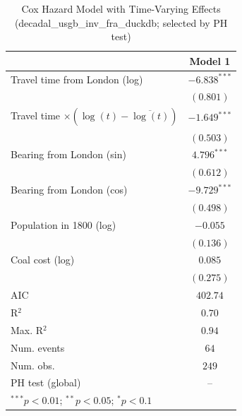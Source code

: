 
\begin{table}
\begin{center}
\begin{tabular}{l c}
\hline
 & Model 1 \\
\hline
Travel time from London (log) & $-6.838^{***}$ \\
 & $(0.801)$ \\
Travel time $\times (\log(t)-\overline{\log(t)})$ & $-1.649^{***}$ \\
 & $(0.503)$ \\
Bearing from London (sin) & $4.796^{***}$ \\
 & $(0.612)$ \\
Bearing from London (cos) & $-9.729^{***}$ \\
 & $(0.498)$ \\
Population in 1800 (log) & $-0.055$ \\
 & $(0.136)$ \\
Coal cost (log) & $0.085$ \\
 & $(0.275)$ \\
\hline
AIC              & $402.74$ \\
R$^2$            & $0.70$ \\
Max. R$^2$       & $0.94$ \\
Num. events      & $64$ \\
Num. obs.        & $249$ \\
PH test (global) & -- \\
\hline
\multicolumn{2}{l}{\scriptsize{$^{***}p<0.01$; $^{**}p<0.05$; $^{*}p<0.1$}}
\end{tabular}
\caption{Cox Hazard Model with Time-Varying Effects (decadal\_usgb\_inv\_fra\_duckdb; selected by PH test)}
\label{tab:cox_serious_tv_decadal_usgb_inv_fra_duckdb}
\end{center}
\end{table}

